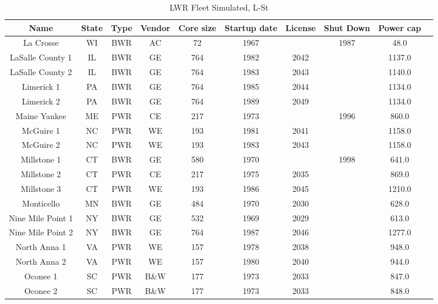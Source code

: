 \begin{table}
    \centering
    \caption{LWR Fleet Simulated, L-St}
    \label{tab:lwr_fleet2}
    \begin{tabular}{c c c c c c c c c c}
    \hline
    \textbf{Name} & \textbf{State} & \textbf{Type} & \textbf{Vendor} & \textbf{Core size} & \textbf{Startup date} & \textbf{License} & \textbf{Shut Down} & \textbf{Power cap} \\
    \hline
    La Crosse           & WI & BWR & AC   & 72  & 1967 &      & 1987 & 48.0  \\
    LaSalle County 1    & IL & BWR & GE   & 764 & 1982 & 2042 &      & 1137.0\\
    LaSalle County 2    & IL & BWR & GE   & 764 & 1983 & 2043 &      & 1140.0\\
    Limerick 1          & PA & BWR & GE   & 764 & 1985 & 2044 &      & 1134.0\\
    Limerick 2          & PA & BWR & GE   & 764 & 1989 & 2049 &      & 1134.0\\
    Maine Yankee        & ME & PWR & CE   & 217 & 1973 &      & 1996 & 860.0 \\
    McGuire 1           & NC & PWR & WE   & 193 & 1981 & 2041 &      & 1158.0\\
    McGuire 2           & NC & PWR & WE   & 193 & 1983 & 2043 &      & 1158.0\\
    Millstone 1         & CT & BWR & GE   & 580 & 1970 &      & 1998 & 641.0 \\
    Millstone 2         & CT & PWR & CE   & 217 & 1975 & 2035 &      & 869.0 \\
    Millstone 3         & CT & PWR & WE   & 193 & 1986 & 2045 &      & 1210.0\\
    Monticello          & MN & BWR & GE   & 484 & 1970 & 2030 &      & 628.0 \\
    Nine Mile Point 1   & NY & BWR & GE   & 532 & 1969 & 2029 &      & 613.0 \\
    Nine Mile Point 2   & NY & BWR & GE   & 764 & 1987 & 2046 &      & 1277.0\\
    North Anna 1        & VA & PWR & WE   & 157 & 1978 & 2038 &      & 948.0 \\
    North Anna 2        & VA & PWR & WE   & 157 & 1980 & 2040 &      & 944.0 \\
    Oconee 1            & SC & PWR & B\&W & 177 & 1973 & 2033 &      & 847.0 \\
    Oconee 2            & SC & PWR & B\&W & 177 & 1973 & 2033 &      & 848.0 \\

\end{tabular}
\end{table}
